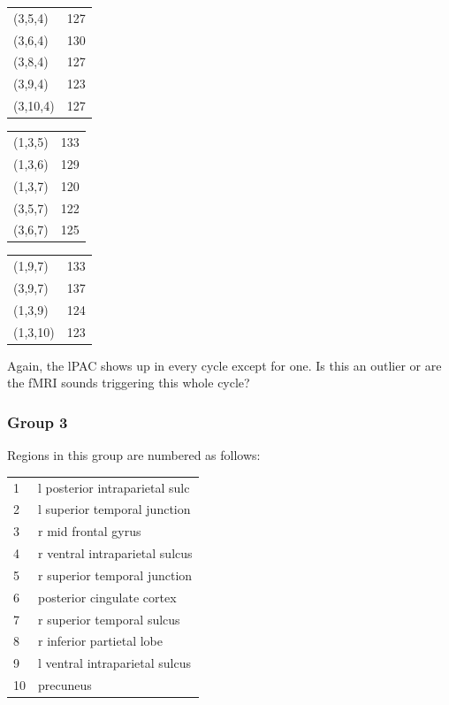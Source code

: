 \documentclass[11pt]{article}
\begin{document}
\vskip 10pt
\begin{center}
\begin{minipage}{.3\textwidth}
\begin{tabular}{ll}
(3,5,4) & 127 \\
(3,6,4) & 130 \\
(3,8,4) & 127 \\
(3,9,4) & 123 \\
(3,10,4) & 127 \\
\end{tabular}
\end{minipage}
\begin{minipage}{.3\textwidth}
\begin{tabular}{ll}
(1,3,5) & 133 \\
(1,3,6) & 129 \\
(1,3,7) & 120 \\
(3,5,7) & 122 \\
(3,6,7) & 125 \\
\end{tabular}
\end{minipage}
\begin{minipage}{.3\textwidth}
\begin{tabular}{ll}
(1,9,7) & 133 \\
(3,9,7) & 137 \\
(1,3,9) & 124 \\
(1,3,10) & 123 \\
\end{tabular}
\end{minipage}
\end{center}
\vskip 10pt

Again, the lPAC shows up in every cycle except for one. Is this an outlier or are the fMRI sounds triggering this whole cycle?

\subsubsection{Group 3}
Regions in this group are numbered as follows: 

\vskip 10pt
\begin{center}
\begin{tabular}{ll}
1 & l posterior intraparietal sulc \\
2 & l superior temporal junction \\
3 & r mid frontal gyrus \\
4 & r ventral intraparietal sulcus \\
5 & r superior temporal junction \\
6 & posterior cingulate cortex \\
7 & r superior temporal sulcus \\
8 & r inferior partietal lobe \\
9 & l ventral intraparietal sulcus \\
10 & precuneus \\
\end{tabular}
\end{center}
\vskip 10pt
\end{document}
